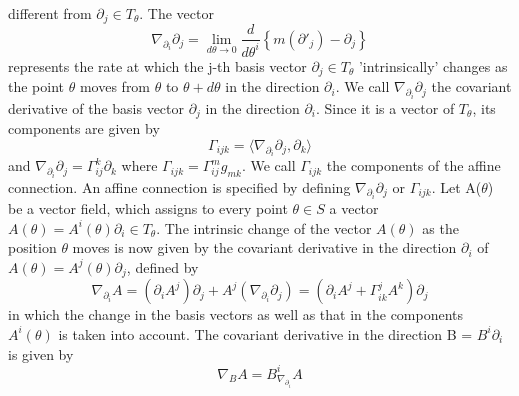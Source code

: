different from $\partial_{j} \in T_{\theta}$. The vector
\begin{equation*}
 \nabla_{\partial_{i}} \partial_{j} = \lim_{d \theta \rightarrow 0} \dfrac{d}{d \theta^{i}}\left\lbrace m(\partial '_{j}) - \partial_{j}\right\rbrace
\end{equation*}
represents the rate at which the j-th basis vector $\partial_{j} \in T_{\theta}$ 'intrinsically' changes as the point $\theta$
moves from $\theta$ to $\theta + d\theta$ in the direction $\partial_{i}$.
We call $\nabla_{\partial_{i}}\partial_j$ the covariant derivative of the basis vector $\partial_j$ in the direction
$\partial_i$. Since it is a vector of $T_{\theta}$, its components are given by 
\begin{equation}
 \Gamma_{ijk} = \langle \nabla_{\partial_{i}}\partial_j , \partial_{k}\rangle
\end{equation}
and $\nabla_{\partial_{i}}\partial_j = \Gamma_{ij}^{k} \partial_k$
where $\Gamma_{ijk} = \Gamma_{ij}^{m}g_{mk}$. We call $\Gamma_{ijk}$ the components of the affine connection. An affine
connection is specified by defining $\nabla_{\partial_{i}}\partial_j$ or $\Gamma_{ijk}$.
   Let A($\theta$) be a vector field, which assigns to every point $\theta \in S$ a 
   vector $A(\theta) = A^{i}(\theta)\partial_i \in T_{\theta}$. The intrinsic change of the vector $A(\theta)$
 as the position $\theta$ moves is now given by the covariant derivative in the direction $\partial_i$ of 
 $A(\theta)= A^{j}(\theta)\partial_j$, defined by 
 \begin{equation}
  \nabla_{\partial_{i}}A = (\partial_{i} A^{j})\partial_j + A^{j}(\nabla_{\partial_{i}} \partial_j) = (\partial_i A^{j}
  + \Gamma^{j}_{ik} A^k )\partial_j
 \end{equation}
in which the change in the basis vectors as well as that in the components $A^i(\theta)$ is taken into account. 
The covariant derivative in the direction B = $B^i \partial_i$ is given by 
\begin{equation*}
 \nabla_B A = B^i_{\nabla_{\partial_{i}}} A
\end{equation*}
